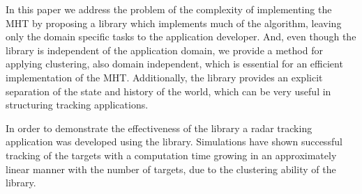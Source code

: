 In this paper we address the problem of the complexity of implementing the MHT by proposing a library which implements much of the algorithm, leaving only the domain specific tasks to the application developer. And, even though the library is independent of the application domain, we provide a method for applying clustering, also domain independent, which is essential for an efficient implementation of the MHT. Additionally, the library provides an explicit separation of the state and history of the world, which can be very useful in structuring tracking applications.

In order to demonstrate the effectiveness of the library a radar tracking application was developed using the library. Simulations have shown successful tracking of the targets with a computation time growing in an approximately linear manner with the number of targets, due to the clustering ability of the library.

